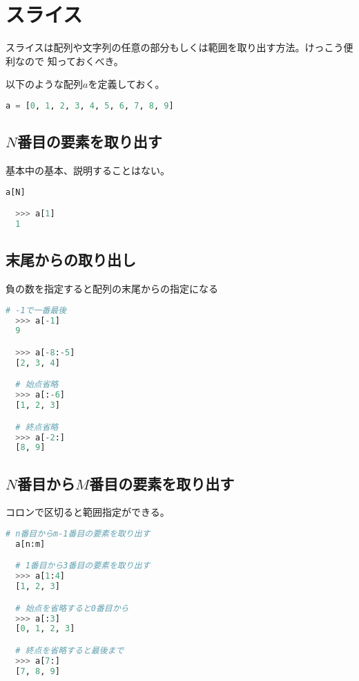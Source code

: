 
\section{スライス}
スライスは配列や文字列の任意の部分もしくは範囲を取り出す方法。けっこう便利なので
知っておくべき。

以下のような配列$a$を定義しておく。
\begin{lstlisting}[language=Python]
  a = [0, 1, 2, 3, 4, 5, 6, 7, 8, 9]
\end{lstlisting}

\subsection{$N$番目の要素を取り出す}

基本中の基本、説明することはない。
\begin{lstlisting}[language=Python]
  a[N]

  >>> a[1]
  1
\end{lstlisting}

\subsection{末尾からの取り出し}

負の数を指定すると配列の末尾からの指定になる

\begin{lstlisting}[language=Python]
  # -1で一番最後
  >>> a[-1]
  9

  >>> a[-8:-5]
  [2, 3, 4]

  # 始点省略
  >>> a[:-6]
  [1, 2, 3]

  # 終点省略
  >>> a[-2:]
  [8, 9]
\end{lstlisting}

\newpage

\subsection{$N$番目から$M$番目の要素を取り出す}
コロンで区切ると範囲指定ができる。
\begin{lstlisting}[language=Python]
  # n番目からm-1番目の要素を取り出す
  a[n:m]

  # 1番目から3番目の要素を取り出す
  >>> a[1:4]
  [1, 2, 3]

  # 始点を省略すると0番目から
  >>> a[:3]
  [0, 1, 2, 3]

  # 終点を省略すると最後まで
  >>> a[7:]
  [7, 8, 9]
\end{lstlisting}


